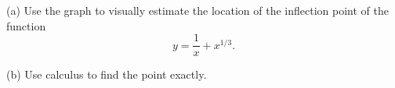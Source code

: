 (a) Use the graph to visually estimate the location of the inflection point
of the function
\begin{equation*}
  y = \frac{1}{x} + x^{1/3}.
\end{equation*}

(b) Use calculus to find the point exactly.
\answercheck
